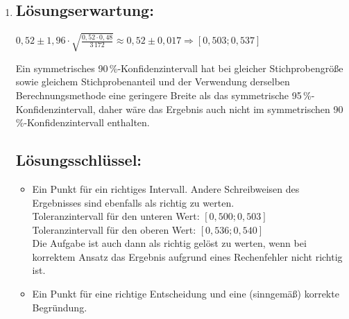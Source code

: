 \begin{langesbeispiel}
{\begin{enumerate}
Mögliche Interpretation:\\
Der Wert der Steigung von $g$ gib an, dass Kandidat $A$ pro zusätzlicher Stimme bei der Vergleichswahl ca. 1,55 Stimmen mehr bei der Bürgermeisterwahl erwarten kann.

\subsection{Lösungsschlüssel:}
\begin{itemize}
\item Ein Punkt für die richtige Lösung.\\
Toleranzintervall: $[530\text{ Stimmen}; 540\text{ Stimmen}]$
\item Ein Punkt für eine korrekte Interpretation.
\end{itemize}

\item \subsection{Lösungserwartung:}

$0,52\pm1,96\cdot\sqrt{\frac{0,52\cdot 0,48}{3\,172}}\approx 0,52\pm 0,017 \Rightarrow [0,503; 0,537]$

Ein symmetrisches 90\,\%-Konfidenzintervall hat bei gleicher Stichprobengröße sowie gleichem Stichprobenanteil und der Verwendung derselben Berechnungsmethode eine geringere Breite als das symmetrische 95\,\%-Konfidenzintervall, daher wäre das Ergebnis auch nicht im symmetrischen 90\,\%-Konfidenzintervall enthalten.

\subsection{Lösungsschlüssel:}
\begin{itemize}
\item Ein Punkt für ein richtiges Intervall. Andere Schreibweisen des Ergebnisses sind ebenfalls als richtig zu werten.\\
Toleranzintervall für den unteren Wert: $[0,500; 0,503]$\\
Toleranzintervall für den oberen Wert: $[0,536; 0,540]$\\
Die Aufgabe ist auch dann als richtig gelöst zu werten, wenn bei korrektem Ansatz das Ergebnis aufgrund eines Rechenfehler nicht richtig ist.
\item Ein Punkt für eine richtige Entscheidung und eine (sinngemäß) korrekte Begründung.
\end{itemize}

\end{enumerate}}
\end{langesbeispiel}